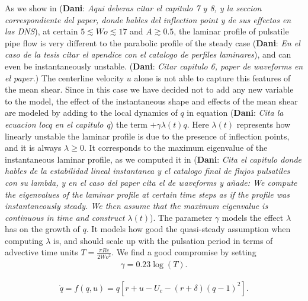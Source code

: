 \documentclass{article}
\DeclareRobustCommand{\dm}[1]{{\color{blue}(\textbf{Dani}: \textit{#1}\xspace)}}
\begin{document}
As we show in \dm{Aqui deberas citar el capitulo 7 y 8, y la seccion correspondiente del paper, donde hables del inflection point y de sus effectos en las DNS}, at certain $5 \lesssim Wo \lesssim 17$ and $A\gtrsim 0.5$, the laminar profile of pulsatile pipe flow is very different to the parabolic profile of the steady case \dm{En el caso de la tesis citar el apendice con el catalogo de perfiles laminares}, and can even be instantaneously unstable. \dm{Citar capitulo 6, paper de waveforms en el paper.} The centerline velocity $u$ alone is not able to capture this features of the mean shear. Since in this case we have decided not to add any new variable to the model, the effect of the instantaneous shape and effects of the mean shear are modeled by adding to the local dynamics of $q$ in equation \dm{Cita la ecuacion locq en el capitulo q} the term $+ \gamma \lambda \left(t\right) q$. Here $\lambda \left(t\right)$ represents how linearly unstable the laminar profile is due to the presence of inflection points, and it is always $\lambda\geq 0$. It corresponds to the maximum eigenvalue of the instantaneous laminar profile, as we computed it in \dm{Cita el capitulo donde hables de la estabilidad lineal instantanea y el catalogo final de flujos pulsatiles con su lambda, y en el caso del paper cita el de waveforms y añade: We compute the eigenvalues of the laminar profile at certain time steps as if the profile was instantaneously steady. We then assume that the maximum eigenvalue is continuous in time and construct $\lambda \left(t \right)$}. The parameter $\gamma$ models the effect $\lambda$ has on the growth of $q$. It models how good the quasi-steady assumption when computing $\lambda$ is, and should scale up with the pulsation period in terms of advective time units $T=\frac{\pi Re}{2 Wo^{2}}$. We find a good compromise by setting
\begin{align}
\gamma = 0.23 \log \left(T\right) \text{.}
\end{align}





\begin{align}
\dot{q}=f\left(q,u\right)=q \left[r+u-U_{c}-\left(r+\delta \right) \left(q -1 \right)^{2} \right]\text{.}
\label{eq:loc_q}
\end{align}





\end{document}
